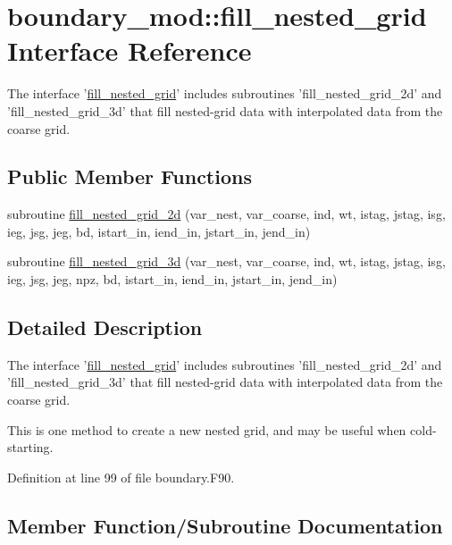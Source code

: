 \section{boundary\-\_\-mod\-:\-:fill\-\_\-nested\-\_\-grid Interface Reference}
\label{interfaceboundary__mod_1_1fill__nested__grid}


The interface '\hyperlink{interfaceboundary__mod_1_1fill__nested__grid}{fill\-\_\-nested\-\_\-grid}' includes subroutines 'fill\-\_\-nested\-\_\-grid\-\_\-2d' and 'fill\-\_\-nested\-\_\-grid\-\_\-3d' that fill nested-\/grid data with interpolated data from the coarse grid.  


\subsection*{Public Member Functions}
\begin{DoxyCompactItemize}
\item 
subroutine \hyperlink{interfaceboundary__mod_1_1fill__nested__grid_a6b5df6a36fb6d889d80bcf2d6b38f5f4}{fill\-\_\-nested\-\_\-grid\-\_\-2d} (var\-\_\-nest, var\-\_\-coarse, ind, wt, istag, jstag, isg, ieg, jsg, jeg, bd, istart\-\_\-in, iend\-\_\-in, jstart\-\_\-in, jend\-\_\-in)
\item 
subroutine \hyperlink{interfaceboundary__mod_1_1fill__nested__grid_a1b9e9179842c2eb58e019abd8c02ffed}{fill\-\_\-nested\-\_\-grid\-\_\-3d} (var\-\_\-nest, var\-\_\-coarse, ind, wt, istag, jstag, isg, ieg, jsg, jeg, npz, bd, istart\-\_\-in, iend\-\_\-in, jstart\-\_\-in, jend\-\_\-in)
\end{DoxyCompactItemize}


\subsection{Detailed Description}
The interface '\hyperlink{interfaceboundary__mod_1_1fill__nested__grid}{fill\-\_\-nested\-\_\-grid}' includes subroutines 'fill\-\_\-nested\-\_\-grid\-\_\-2d' and 'fill\-\_\-nested\-\_\-grid\-\_\-3d' that fill nested-\/grid data with interpolated data from the coarse grid. 

This is one method to create a new nested grid, and may be useful when cold-\/starting. 

Definition at line 99 of file boundary.\-F90.



\subsection{Member Function/\-Subroutine Documentation}
